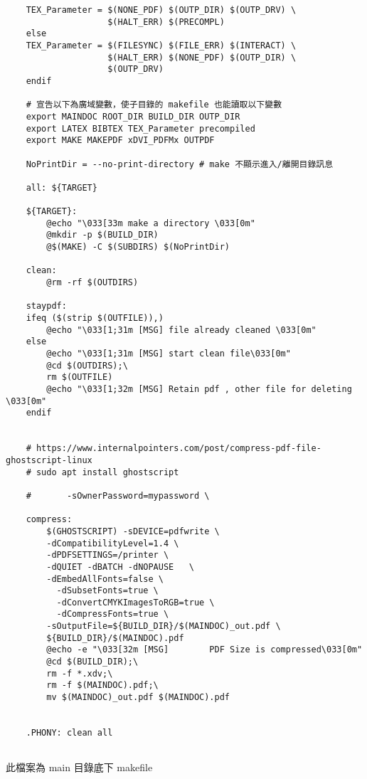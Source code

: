 \begin{lstlisting}
    TEX_Parameter = $(NONE_PDF) $(OUTP_DIR) $(OUTP_DRV) \
                    $(HALT_ERR) $(PRECOMPL) 
    else
    TEX_Parameter = $(FILESYNC) $(FILE_ERR) $(INTERACT) \
                    $(HALT_ERR) $(NONE_PDF) $(OUTP_DIR) \
                    $(OUTP_DRV)
    endif
    
    # 宣告以下為廣域變數，使子目錄的 makefile 也能讀取以下變數
    export MAINDOC ROOT_DIR BUILD_DIR OUTP_DIR
    export LATEX BIBTEX TEX_Parameter precompiled
    export MAKE MAKEPDF xDVI_PDFMx OUTPDF
    
    NoPrintDir = --no-print-directory # make 不顯示進入/離開目錄訊息
    
    all: ${TARGET}
    
    ${TARGET}:
        @echo "\033[33m make a directory \033[0m"
        @mkdir -p $(BUILD_DIR)
        @$(MAKE) -C $(SUBDIRS) $(NoPrintDir)
    
    clean:
        @rm -rf $(OUTDIRS)
    
    staypdf:
    ifeq ($(strip $(OUTFILE)),)
        @echo "\033[1;31m [MSG] file already cleaned \033[0m"
    else
        @echo "\033[1;31m [MSG] start clean file\033[0m"
        @cd $(OUTDIRS);\
        rm $(OUTFILE)
        @echo "\033[1;32m [MSG] Retain pdf , other file for deleting \033[0m"
    endif
    
    
    # https://www.internalpointers.com/post/compress-pdf-file-ghostscript-linux
    # sudo apt install ghostscript
    
    # 		-sOwnerPassword=mypassword \
    
    compress:
        $(GHOSTSCRIPT) -sDEVICE=pdfwrite \
        -dCompatibilityLevel=1.4 \
        -dPDFSETTINGS=/printer \
        -dQUIET -dBATCH -dNOPAUSE	\
        -dEmbedAllFonts=false \
          -dSubsetFonts=true \
          -dConvertCMYKImagesToRGB=true \
          -dCompressFonts=true \
        -sOutputFile=${BUILD_DIR}/$(MAINDOC)_out.pdf \
        ${BUILD_DIR}/$(MAINDOC).pdf
        @echo -e "\033[32m [MSG] 		PDF Size is compressed\033[0m"	
        @cd $(BUILD_DIR);\
        rm -f *.xdv;\
        rm -f $(MAINDOC).pdf;\
        mv $(MAINDOC)_out.pdf $(MAINDOC).pdf
    
    
    .PHONY: clean all
    
 \end{lstlisting}

 \newpage

 此檔案為 main 目錄底下 makefile

